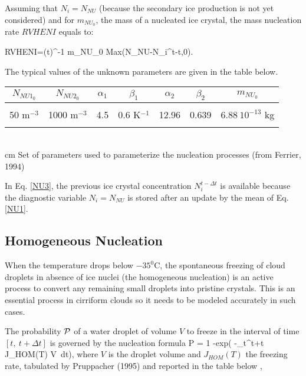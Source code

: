 Assuming that $N_i=N_{NU}$ (because the secondary ice production is not yet
considered) and for $m_{NU_0}$, the mass of a nucleated ice crystal, the mass
nucleation rate $RVHENI$ equals to:

%
\be\label{NU3}
RVHENI=(\rho \Delta t)^{-1} m_{NU_0} Max(N_{NU}-N_i^{t-\Delta t},0).
\ee
%

The typical values of the unknown parameters are given in the table below.

\begin{center}\label{table3}
\begin{tabular}{|c|c|c|c|c|c|c|}
\hline
$N_{NU1_0}$ & $N_{NU2_0}$ & $\alpha_1$ & $\beta_1$& $\alpha_2$ & $\beta_2$ & $m_{NU_0}$  \\
\hline \hline
 & & & & & & \\
50 m$^{-3}$ & 1000 m$^{-3}$ & 4.5 & 0.6 K$^{-1}$ & 12.96 & 0.639 & $6.88\ 10^{-13}$ kg \\
 & & & & & & \\
\hline
\end{tabular}
\\
 cm
Set of parameters used to parameterize the nucleation processes (from Ferrier, 1994)
\end{center}

In Eq. \ref{NU3}, the previous ice crystal concentration $N_i^{t-\Delta t}$ is
available because the diagnostic variable $N_i=N_{NU}$ is stored after an
update by the mean of Eq. \ref{NU1}.

%
\subsection{Homogeneous Nucleation}
%
When the temperature drops below $-35^{0}$C, the spontaneous freezing of cloud
droplets in absence of ice nuclei (the homogeneous nucleation) is an active
process to convert any remaining small droplets into pristine crystals. This is
an essential process in cirriform clouds so it needs to be modeled accurately in
such cases.

The probability ${\cal P}$ of a water droplet of volume $V$ to freeze in the
interval of time $[t,\ t+\Delta t]$ is governed by the nucleation formula
%
\be\label{HOM1}
{\cal P} = 1 -exp\Big( -\int_{t}^{t+\Delta t} J_{HOM}(T) V\ dt\Big),
\ee
%
\noindent where $V$ is the droplet volume and $J_{HOM}(T)$ the freezing rate,
tabulated by Pruppacher (1995) and reported in the table below\footnotemark
%
%
,

